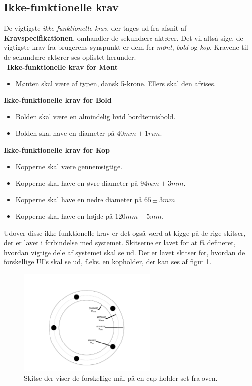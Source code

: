 \documentclass[Rapport/Rapport_main.tex]{subfiles}
\begin{document}
\subsection{Ikke-funktionelle krav}\label{sec:rap_ikke_funktionelle_krav}
De vigtigste \textit{ikke-funktionelle krav}, der tages ud fra afsnit  af \textbf{Kravspecifikationen}, omhandler de sekundære aktører. Det vil altså sige, de vigtigste krav fra brugerens synspunkt er dem for \textit{mønt}, \textit{bold} og \textit{kop}. Kravene til de sekundære aktører ses oplistet herunder. \\\
\textbf{Ikke-funktionelle krav for Mønt}
\begin{itemize}
    \item Mønten skal være af typen, dansk 5-krone\cite{fiveKrCoin}. Ellers skal den afvises.
\end{itemize}
\textbf{Ikke-funktionelle krav for Bold}
\begin{itemize}
    \item Bolden skal være en almindelig hvid bordtennisbold\cite{pingpongball}.
    \item Bolden skal have en diameter på $40mm \pm{1mm}$.
\end{itemize}
\textbf{Ikke-funktionelle krav for Kop} 
\begin{itemize}
    \item Kopperne skal være gennemsigtige.
    \item Kopperne skal have en øvre diameter på $94mm \pm{3mm}$.
    \item Kopperne skal have en nedre diameter på $65 \pm{3mm}$
    \item Kopperne skal have en højde på $120mm \pm{5mm}$.
\end{itemize}
Udover disse ikke-funktionelle krav er det også værd at kigge på de rige skitser, der er lavet i forbindelse med systemet. Skitserne er lavet for at få defineret, hvordan vigtige dele af systemet skal se ud. Der er lavet skitser for, hvordan de forskellige UI's skal se ud, f.eks. en kopholder, der kan ses af figur \ref{fig:rap_LEDplacement}.
\begin{figure}[H]
    \centering
    \includegraphics[width=0.6\textwidth,trim={2in 0.4in 2in 1.3in},clip, page=1]{Kravspecifikation/Ikke-funktionelle/graphics/LEDplacement.pdf}
    \caption{Skitse der viser de forskellige mål på en cup holder set fra oven.}
    \label{fig:rap_LEDplacement}
\end{figure}
\end{document}
